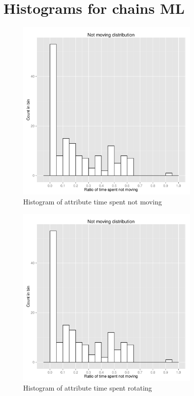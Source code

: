 \FloatBarrier

\section{Histograms for chains ML}
\begin{figure}[!htbp]
  \centering
	\includegraphics[page=1,width=0.8\textwidth]{Images/chains_features_ML}
	\caption{Histogram of attribute time spent not moving}
	\label{fig:chains-distrib-stop}
\end{figure}

\begin{figure}[!htbp]
  \centering
	\includegraphics[page=2,width=0.8\textwidth]{Images/chains_features_ML}
	\caption{Histogram of attribute time spent rotating}
	\label{fig:chains-distrib-rotate}
\end{figure}

